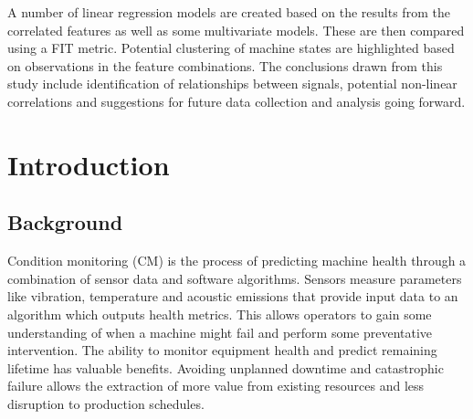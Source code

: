\documentclass[]{article}
\begin{document}
A number of linear regression models are created based on the results from the correlated features as well as some multivariate models. These are then compared using a FIT metric. Potential clustering of machine states are highlighted based on observations in the feature combinations. The conclusions drawn from this study include identification of relationships between signals, potential non-linear correlations and suggestions for future data collection and analysis going forward.
\clearpage

\setcounter{tocdepth}{3}
\tableofcontents
\newpage

\listoffigures
\listoftables
\newpage

\printnoidxglossary[type=\acronymtype, style=list, nogroupskip=true]
\newpage


\section{Introduction}
\subsection{Background}
Condition monitoring (\gls{CM}) is the process of predicting machine health through a combination of sensor data and software algorithms. Sensors measure parameters like vibration, temperature and acoustic emissions that provide input data to an algorithm which outputs health metrics. This allows operators to gain some understanding of when a machine might fail and perform some preventative intervention. The ability to monitor equipment health and predict remaining lifetime has valuable benefits. Avoiding unplanned downtime and catastrophic failure allows the extraction of more value from existing resources and less disruption to production schedules.
\end{document}
